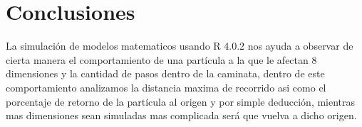 \documentclass{article}
\begin{document}
\newpage

\section{Conclusiones}

La simulaci\'on de modelos matematicos usando R 4.0.2 nos ayuda a observar de cierta manera el comportamiento de una part\'icula a la que le afectan 8 dimensiones y la cantidad de pasos dentro de la caminata, dentro de este comportamiento analizamos la distancia maxima de recorrido asi como el porcentaje de retorno de la part\'icula al origen y por simple deducci\'on, mientras mas dimensiones sean simuladas  mas complicada ser\'a que vuelva a dicho origen.



\end{document}
